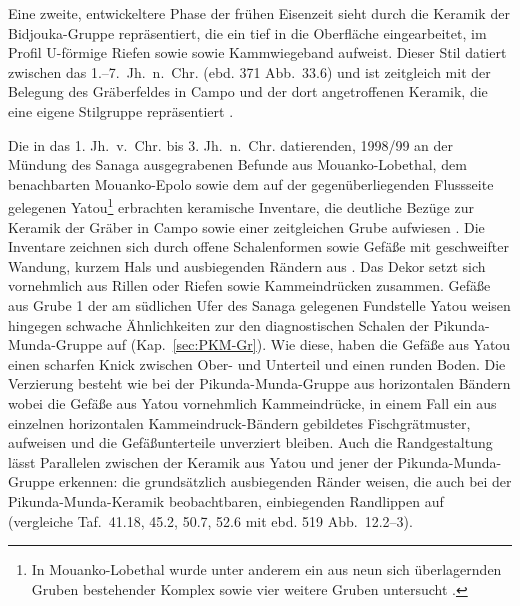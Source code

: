 Eine zweite, entwickeltere Phase der frühen Eisenzeit sieht \textcite[363--369, 368 Abb.~30.6]{GouemGouem.20102011} durch die Keramik der Bidjouka-Gruppe repräsentiert, die ein tief in die Oberfläche eingearbeitet, im Profil U-förmige Riefen sowie sowie Kammwiegeband aufweist. Dieser Stil datiert zwischen das 1.--7.~Jh.~n.~Chr. (ebd. 371 Abb.~33.6) und ist zeitgleich mit der Belegung des Gräberfeldes in Campo und der dort angetroffenen Keramik, die eine eigene Stilgruppe repräsentiert \parencite[98 Abb.~5.6]{Eggert.2016}.

Die in das 1. Jh.~v.~Chr. bis 3. Jh.~n.~Chr. datierenden, 1998/99 an der Mündung des Sanaga ausgegrabenen Befunde aus Mouanko-Lobethal, dem benachbarten Mouanko-Epolo sowie dem auf der gegenüberliegenden Flussseite gelegenen Yatou\footnote{In Mouanko-Lobethal wurde unter anderem ein aus neun sich überlagernden Gruben bestehender Komplex sowie vier weitere Gruben untersucht \parencite[513]{Eggert.2002}.} erbrachten keramische Inventare, die deutliche Bezüge zur Keramik der Gräber in Campo \parencite[98 Abb.~5.6]{Eggert.2016} sowie einer zeitgleichen Grube aufwiesen \parencite[161 Abb.~3.5--10]{Seidensticker.2010c}. Die Inventare zeichnen sich durch offene Schalenformen sowie Gefäße mit geschweifter Wandung, kurzem Hals und ausbiegenden Rändern aus \parencite[514--519 Abb.~7--12]{Eggert.2002}. Das Dekor setzt sich vornehmlich aus Rillen oder Riefen sowie Kammeindrücken zusammen. Gefäße aus Grube 1 der am südlichen Ufer des Sanaga gelegenen Fundstelle Yatou weisen hingegen schwache Ähnlichkeiten zur den diagnostischen Schalen der Pikunda-Munda-Gruppe auf (Kap.~\ref{sec:PKM-Gr}). Wie diese, haben die Gefäße aus Yatou einen scharfen Knick zwischen Ober- und Unterteil und einen runden Boden. Die Verzierung besteht wie bei der Pikunda-Munda-Gruppe aus horizontalen Bändern wobei die Gefäße aus Yatou vornehmlich Kammeindrücke, in einem Fall ein aus einzelnen horizontalen Kammeindruck-Bändern gebildetes Fischgrätmuster, aufweisen und die Gefäßunterteile unverziert bleiben. Auch die Randgestaltung lässt Parallelen zwischen der Keramik aus Yatou und jener der Pikunda-Munda-Gruppe erkennen: die grundsätzlich ausbiegenden Ränder weisen, die auch bei der Pikunda-Munda-Keramik beobachtbaren, einbiegenden Randlippen auf (vergleiche Taf.~41.18, 45.2, 50.7, 52.6 mit ebd. 519 Abb.~12.2--3).\clearpage

